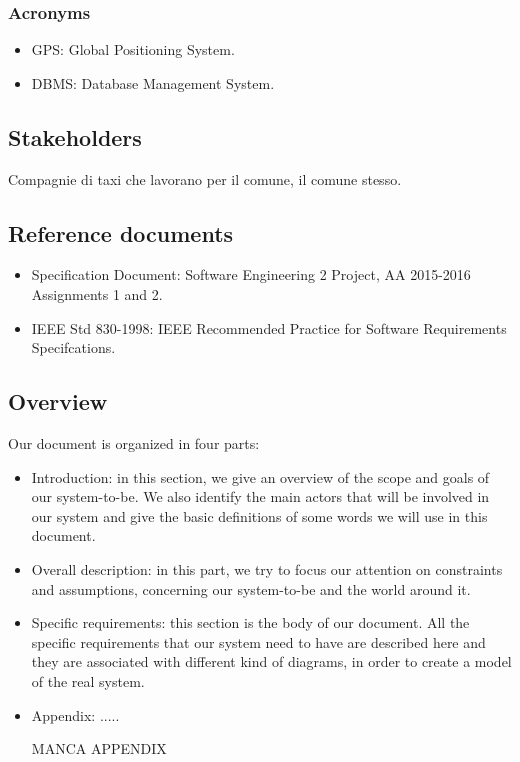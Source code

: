 \documentclass{article}
\begin{document}
    \subsubsection{Acronyms}
        \begin{itemize}
            \item GPS: Global Positioning System.
            \item DBMS: Database Management System.
        \end{itemize}
    
    \subsection{Stakeholders}
        Compagnie di taxi che lavorano per il comune, il comune stesso.
    
	\subsection{Reference documents}
	    \begin{itemize}
	        \item Specification Document: Software Engineering 2 Project, AA 2015-2016 Assignments 1 and 2.
	        \item IEEE Std 830-1998: IEEE Recommended Practice for Software Requirements Specifcations.
	    \end{itemize}

	
	\subsection{Overview}
	    Our document is organized in four parts:
	    \begin{itemize}
	    \item Introduction: in this section, we give an overview of the scope and goals of our system-to-be. We also identify the main actors that will be involved in our system and give the basic definitions of some words we will use in this document.
	    \item Overall description: in this part, we try to focus our attention on constraints and assumptions, concerning our system-to-be and the world around it. 
	    \item Specific requirements: this section is the body of our document. All the specific requirements that our system need to have are described here and they are associated with different kind of diagrams, in order to create a model of the real system.
	    \item Appendix: .....
	    
	    MANCA APPENDIX
	    
	    \end{itemize}
	
\end{document}
